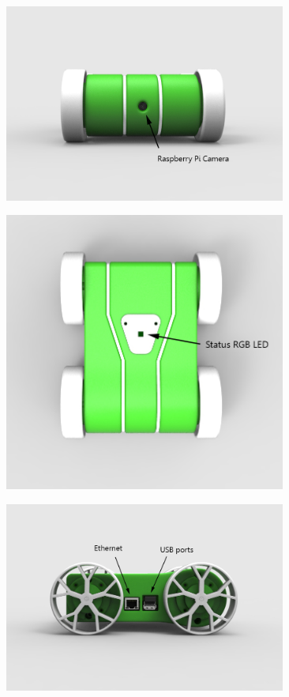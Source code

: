\documentclass[12pt,titlepage,oneside]{memoir}
\begin{document}
\begin{figure}[!htbp]
\includegraphics[width=350px]{render/pibotfront.jpg}
\centering
\end{figure}

\begin{figure}[!htbp]
\includegraphics[width=350px]{render/pibottop.jpg}
\centering
\end{figure}

\begin{figure}[!htbp]
\includegraphics[width=350px]{render/pibotstarboard.jpg}
\centering
\end{figure}
\end{document}
